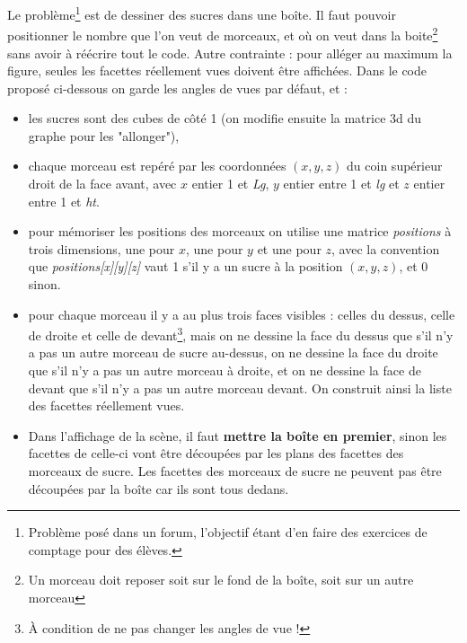 \documentclass[%
10pt,%
a4paper,%
french,%
]%
{article}%
\begin{document}
Le problème\footnote{Problème posé dans un forum, l'objectif étant d'en faire des exercices de comptage pour des élèves.} est de dessiner des sucres dans une boîte. Il faut pouvoir positionner le nombre que l'on veut de morceaux, et où on veut dans la boite\footnote{Un morceau doit reposer soit sur le fond de la boîte, soit sur un autre morceau} sans avoir à réécrire tout le code. Autre contrainte : pour alléger au maximum la figure, seules les facettes réellement vues doivent être affichées. Dans le code proposé ci-dessous on garde les angles de vues par défaut, et :
\begin{itemize}
    \item les sucres sont des cubes de côté 1 (on modifie ensuite la matrice 3d du graphe pour les "allonger"),
    \item chaque morceau est repéré par les coordonnées $(x,y,z)$ du coin supérieur droit de la face avant, avec $x$ entier 1 et \emph{Lg}, $y$ entier entre 1 et \emph{lg} et $z$ entier entre 1 et \emph{ht}.
    \item pour mémoriser les positions des morceaux on utilise une matrice \emph{positions} à trois dimensions, une pour $x$, une pour $y$ et une pour $z$, avec la convention que \emph{positions[x][y][z]} vaut 1 s'il y a un sucre à la position $(x,y,z)$, et 0 sinon.
    \item pour chaque morceau il y a au plus trois faces visibles : celles du dessus, celle de droite et celle de devant\footnote{À condition de ne pas changer les angles de vue !}, mais on ne dessine la face du dessus que s'il n'y a pas un autre morceau de sucre au-dessus, on ne dessine la face du droite que s'il n'y a pas un autre morceau à droite, et on ne dessine la face de devant que s'il n'y a pas un autre morceau devant. On construit ainsi la liste des facettes réellement vues.
    \item Dans l'affichage de la scène, il faut \textbf{mettre la boîte en premier}, sinon les facettes de celle-ci vont être découpées par les plans des facettes des morceaux de sucre. Les facettes des morceaux de sucre ne peuvent pas être découpées par la boîte car ils sont tous dedans.
\end{itemize}
\end{document}
